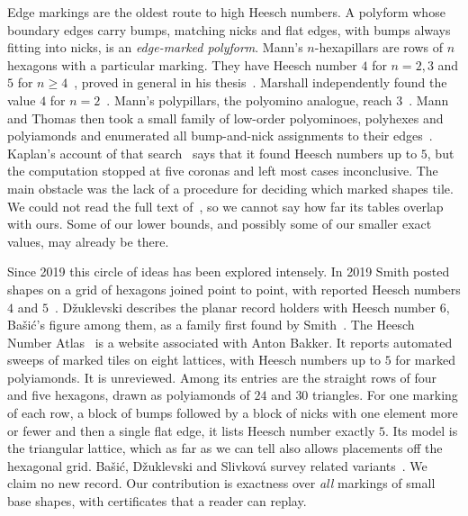 \documentclass[11pt]{amsart}
\theoremstyle{definition}
\theoremstyle{remark}
\begin{document}
Edge markings are the oldest route to high Heesch numbers. A polyform whose boundary edges carry bumps, matching nicks and flat edges, with bumps always fitting into nicks, is an \emph{edge-marked polyform}. Mann's $n$-hexapillars are rows of $n$ hexagons with a particular marking. They have Heesch number $4$ for $n=2,3$ and $5$ for $n\ge4$~\cite[Theorem~1]{Mann2004}, proved in general in his thesis~\cite{MannThesis}. Marshall independently found the value $4$ for $n=2$~\cite{Mann2004}. Mann's polypillars, the polyomino analogue, reach $3$~\cite[Theorem~2]{Mann2004}. Mann and Thomas then took a small family of low-order polyominoes, polyhexes and polyiamonds and enumerated all bump-and-nick assignments to their edges~\cite{MannThomas2016}. Kaplan's account of that search~\cite{Kaplan2022} says that it found Heesch numbers up to $5$, but the computation stopped at five coronas and left most cases inconclusive. The main obstacle was the lack of a procedure for deciding which marked shapes tile. We could not read the full text of~\cite{MannThomas2016}, so we cannot say how far its tables overlap with ours. Some of our lower bounds, and possibly some of our smaller exact values, may already be there.

Since 2019 this circle of ideas has been explored intensely. In 2019 Smith posted shapes on a grid of hexagons joined point to point, with reported Heesch numbers $4$ and $5$~\cite{SmithBlog2019}. D\v{z}uklevski describes the planar record holders with Heesch number $6$, Ba\v{s}i\'c's figure among them, as a family first found by Smith~\cite{Dzuklevski2026}. The Heesch Number Atlas~\cite{BakkerAtlas} is a website associated with Anton Bakker. It reports automated sweeps of marked tiles on eight lattices, with Heesch numbers up to $5$ for marked polyiamonds. It is unreviewed. Among its entries are the straight rows of four and five hexagons, drawn as polyiamonds of $24$ and $30$ triangles. For one marking of each row, a block of bumps followed by a block of nicks with one element more or fewer and then a single flat edge, it lists Heesch number exactly $5$. Its model is the triangular lattice, which as far as we can tell also allows placements off the hexagonal grid. Ba\v{s}i\'c, D\v{z}uklevski and Slivkov\'a survey related variants~\cite{BDS2023}. We claim no new record. Our contribution is exactness over \emph{all} markings of small base shapes, with certificates that a reader can replay.
\end{document}
